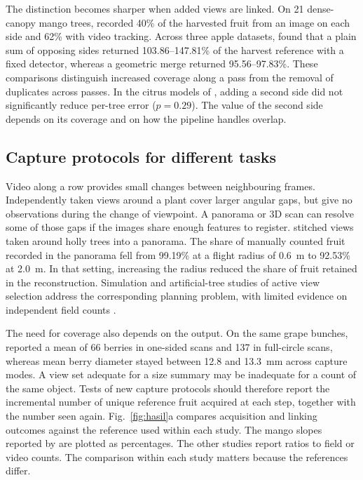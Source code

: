 The distinction becomes sharper when added views are linked. On 21 dense-canopy mango trees, \citet{wang2019mango} recorded 40\% of the harvested fruit from an image on each side and 62\% with video tracking. Across three apple datasets, \citet{hani2020comparative} found that a plain sum of opposing sides returned 103.86--147.81\% of the harvest reference with a fixed detector, whereas a geometric merge returned 95.56--97.83\%. These comparisons distinguish increased coverage along a pass from the removal of duplicates across passes. In the citrus models of \citet{vijayakumar2023tree}, adding a second side did not significantly reduce per-tree error ($p=0.29$). The value of the second side depends on its coverage and on how the pipeline handles overlap.

\subsection{Capture protocols for different tasks}\label{sec:acq-protocol}

Video along a row provides small changes between neighbouring frames. Independently taken views around a plant cover larger angular gaps, but give no observations during the change of viewpoint. A panorama or 3D scan can resolve some of those gaps if the images share enough features to register. \citet{zhang2022complete} stitched views taken around holly trees into a panorama. The share of manually counted fruit recorded in the panorama fell from 99.19\% at a flight radius of 0.6~m to 92.53\% at 2.0~m. In that setting, increasing the radius reduced the share of fruit retained in the reconstruction. Simulation and artificial-tree studies of active view selection address the corresponding planning problem, with limited evidence on independent field counts \citep{roy2017active,zaenker2021viewpoint,zaenker2023graph}.

The need for coverage also depends on the output. On the same grape bunches, \citet{rist2018high} reported a mean of 66 berries in one-sided scans and 137 in full-circle scans, whereas mean berry diameter stayed between 12.8 and 13.3~mm across capture modes. A view set adequate for a size summary may be inadequate for a count of the same object. Tests of new capture protocols should therefore report the incremental number of unique reference fruit acquired at each step, together with the number seen again. Fig.~\ref{fig:hasil}a compares acquisition and linking outcomes against the reference used within each study. The mango slopes reported by \citet{stein2016image} are plotted as percentages. The other studies report ratios to field or video counts. The comparison within each study matters because the references differ.

